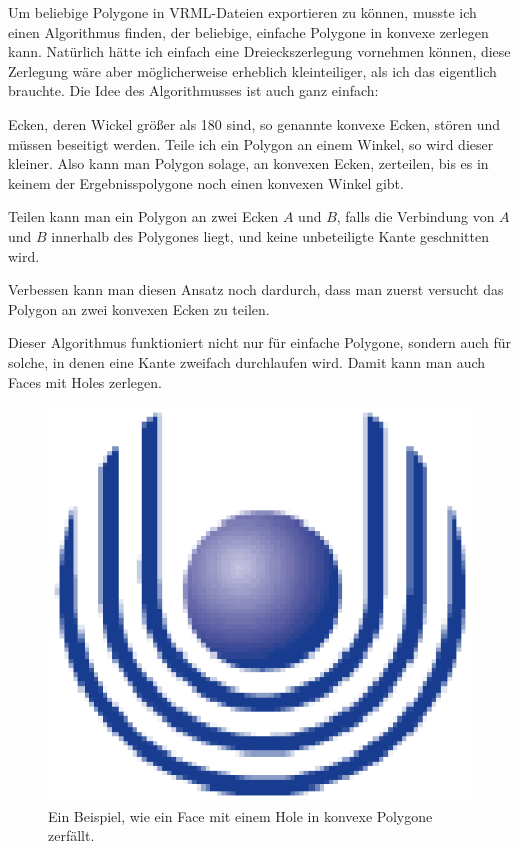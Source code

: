 Um beliebige Polygone in VRML-Dateien exportieren zu können, musste ich einen Algorithmus finden, der beliebige, einfache Polygone in konvexe zerlegen kann. Natürlich hätte ich einfach eine Dreieckszerlegung vornehmen können, diese Zerlegung wäre aber möglicherweise erheblich kleinteiliger, als ich das eigentlich brauchte. Die Idee des Algorithmusses ist auch ganz einfach:

Ecken, deren Wickel größer als 180\degree\/ sind, so genannte konvexe Ecken, stören und müssen beseitigt werden. Teile ich ein Polygon an einem Winkel, so wird dieser kleiner. Also kann man Polygon solage, an konvexen Ecken,  zerteilen, bis es in keinem der Ergebnisspolygone noch einen konvexen Winkel gibt.

Teilen kann man ein Polygon an zwei Ecken $A$ und $B$, falls die Verbindung von $A$ und $B$ innerhalb des Polygones liegt, und keine unbeteiligte Kante geschnitten wird.

Verbessen kann man diesen Ansatz noch dardurch, dass man zuerst versucht das Polygon an zwei konvexen Ecken zu teilen.

Dieser Algorithmus funktioniert nicht nur für einfache Polygone, sondern auch für solche, in denen eine Kante zweifach durchlaufen wird. Damit kann man auch Faces mit Holes zerlegen.

\begin{figure}
	\centering
	\includegraphics{feu_logo2.eps}
	\caption{Ein Beispiel, wie ein Face mit einem Hole in konvexe Polygone zerfällt.}
	\label{fig:ZerlegungFace}
\end{figure}


